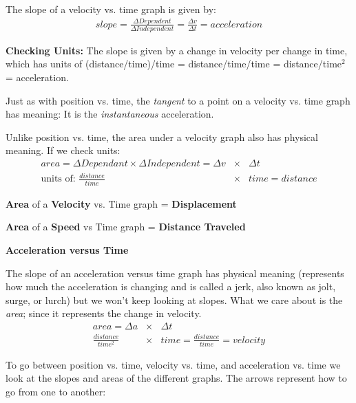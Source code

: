 \documentclass[12pt]{article}
\begin{document}
The slope of a velocity vs. time graph is given by:
\begin{eqnarray}
slope = \frac{\Delta Dependent}{\Delta Independent} = \frac{\Delta v}{\Delta t} = acceleration \nonumber
\end{eqnarray}

\textbf{Checking Units:} The slope is given by a change in velocity per change in time, which has units of (distance/time)/time = distance/time/time = distance/time$^2$ = acceleration.

Just as with position vs. time, the \textit{tangent} to a point on a velocity vs. time graph has meaning: It is the \textit{instantaneous} acceleration.

Unlike position vs. time, the area under a velocity graph also has physical meaning. If we check units:
\begin{eqnarray}
area = \Delta Dependant \times \Delta Independent = \Delta v &\times & \Delta t \nonumber \\
\textrm{units of: } \frac{distance}{time} &\times & time = distance
\end{eqnarray}

\textbf{Area} of a \textbf{Velocity} vs. Time graph = \textbf{Displacement}

\textbf{Area} of a \textbf{Speed} vs Time graph = \textbf{Distance Traveled}
\vspace{0.2in}

\noindent\textbf{\large Acceleration versus Time}

The slope of an acceleration versus time graph has physical meaning (represents how much the acceleration is changing and is called a jerk, also known as jolt, surge, or lurch) but we won't keep looking at slopes. What we care about is the \textit{area}; since it represents the change in velocity.
\begin{eqnarray}
area = \Delta a &\times & \Delta t \nonumber \\
\frac{distance}{time^2} &\times & time = \frac{distance}{time} = velocity
\end{eqnarray}

To go between position vs. time, velocity vs. time, and acceleration vs. time we look at the slopes and areas of the different graphs. The arrows represent how to go from one to another:

\begin{center}\end{center}
\end{document}
